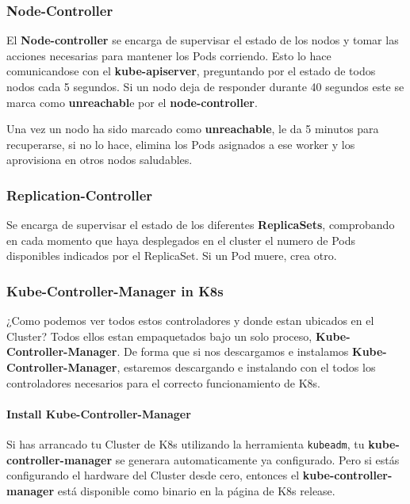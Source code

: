 \documentclass{article}
\begin{document}
\subsubsection{Node-Controller}
El \textbf{Node-controller} se encarga de supervisar el estado de los nodos y tomar las acciones necesarias para mantener los Pods corriendo. Esto lo hace comunicandose con el \textbf{kube-apiserver}, preguntando por el estado de todos nodos cada 5 segundos. Si un nodo deja de responder durante 40 segundos este se marca como \textbf{unreachabl}e por el \textbf{node-controller}.

Una vez un nodo ha sido marcado como \textbf{unreachable}, le da 5 minutos para recuperarse, si no lo hace, elimina los Pods asignados a ese worker y los aprovisiona en otros nodos saludables.

\subsubsection{Replication-Controller}
Se encarga de supervisar el estado de los diferentes \textbf{ReplicaSets}, comprobando en cada momento que haya desplegados en el cluster el numero de Pods disponibles indicados por el ReplicaSet. Si un Pod muere, crea otro.

\subsubsection{Kube-Controller-Manager in K8s}

¿Como podemos ver todos estos controladores y donde estan ubicados en el Cluster? Todos ellos estan empaquetados bajo un solo proceso, \textbf{Kube-Controller-Manager}. De forma que si nos descargamos e instalamos \textbf{Kube-Controller-Manager}, estaremos descargando e instalando con el todos los controladores necesarios para el correcto funcionamiento de K8s.

\paragraph{Install Kube-Controller-Manager}

Si has arrancado tu Cluster de K8s utilizando la herramienta \verb|kubeadm|, tu \textbf{kube-controller-manager} se generara automaticamente ya configurado. Pero si estás configurando el hardware del Cluster desde cero, entonces el \textbf{kube-controller-manager} está disponible como binario en la página de K8s release.
\end{document}
